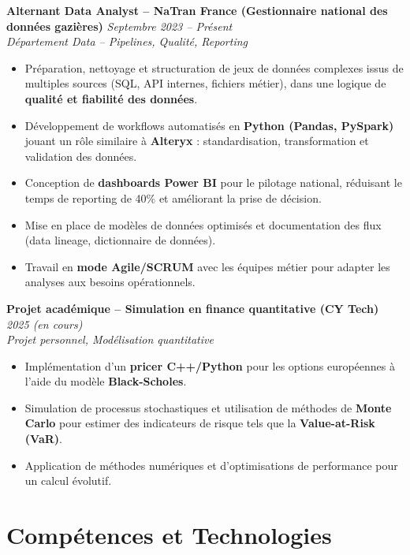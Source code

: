 \documentclass[10pt, letterpaper]{article}
\begin{document}
\textbf{Alternant Data Analyst – NaTran France (Gestionnaire national des données gazières)} 
\hfill \textit{Septembre 2023 – Présent}\\
\textit{Département Data – Pipelines, Qualité, Reporting}
\begin{itemize}
    \item Préparation, nettoyage et structuration de jeux de données complexes issus de multiples sources (SQL, API internes, fichiers métier), dans une logique de \textbf{qualité et fiabilité des données}.
    \item Développement de workflows automatisés en \textbf{Python (Pandas, PySpark)} jouant un rôle similaire à \textbf{Alteryx} : standardisation, transformation et validation des données.
    \item Conception de \textbf{dashboards Power BI} pour le pilotage national, réduisant le temps de reporting de 40\% et améliorant la prise de décision.
    \item Mise en place de modèles de données optimisés et documentation des flux (data lineage, dictionnaire de données).
    \item Travail en \textbf{mode Agile/SCRUM} avec les équipes métier pour adapter les analyses aux besoins opérationnels.
\end{itemize}

\vspace{0.2cm}

\textbf{Projet académique – Simulation en finance quantitative (CY Tech)} \hfill \textit{2025 (en cours)}\\
\textit{Projet personnel, Modélisation quantitative}
\begin{itemize}
    \item Implémentation d’un \textbf{pricer C++/Python} pour les options européennes à l’aide du modèle \textbf{Black-Scholes}.
    \item Simulation de processus stochastiques et utilisation de méthodes de \textbf{Monte Carlo} pour estimer des indicateurs de risque tels que la \textbf{Value-at-Risk (VaR)}.
    \item Application de méthodes numériques et d’optimisations de performance pour un calcul évolutif.
\end{itemize}

\section*{Compétences et Technologies}
\end{document}

